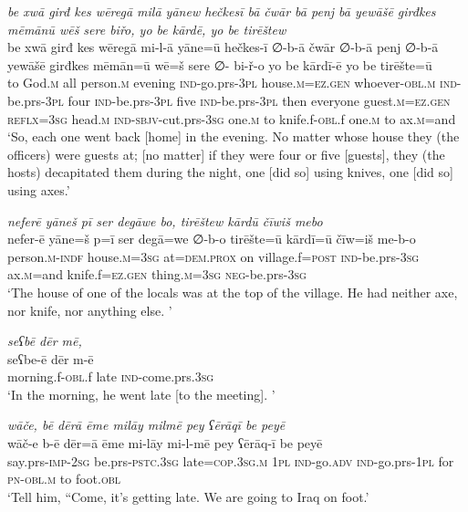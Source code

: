 \ea \label{BP.70}
\textit{be xwā girđ kes wēregā milā yānew hečkesī bā čwār bā penj bā yewāšē girđkes mēmānū wēš sere biřo, yo be kārdē, yo be tirēštew} \\ 
\gll be xwā girđ kes wēregā mi-l-ā yāne=ū hečkes-ī ∅-b-ā čwār ∅-b-ā penj ∅-b-ā yewāšē girđkes mēmān=ū wē=š sere ∅- bi-ř-o yo be kārdī-ē yo be tirēšte=ū \\ 
 to God\textsc{.m} all person\textsc{.m} evening \textsc{ind-}go.prs\textsc{-3pl} house\textsc{.m}\textsc{=ez.gen} whoever\textsc{-obl}\textsc{.m} \textsc{ind-}be.prs\textsc{-3pl} four \textsc{ind-}be.prs\textsc{-3pl} five \textsc{ind-}be.prs\textsc{-3pl} then everyone guest\textsc{.m}\textsc{=ez.gen} \textsc{reflx}\textsc{=3sg} head\textsc{.m} \textsc{ind-}\textsc{sbjv-}cut.prs\textsc{-3sg} one\textsc{.m} to knife.f\textsc{-obl}.f one\textsc{.m} to ax\textsc{.m}=and \\ 
\glt `So, each one went back [home] in the evening. No matter whose house they (the officers) were guests at; [no matter] if they were four or five [guests],  they  (the hosts) decapitated them during the night, one [did so] using knives, one [did so] using axes.'
\z 
 
\ea \label{BP.71}
\textit{neferē yāneš pī ser degāwe bo, tirēštew kārdū čīwiš mebo} \\ 
\gll nefer-ē yāne=š p=ī ser degā=we ∅-b-o tirēšte=ū kārdī=ū čīw=iš me-b-o \\ 
 person\textsc{.m}\textsc{-indf} house\textsc{.m}\textsc{=3sg} at=\textsc{dem.prox} on village.f\textsc{=\textsc{post}} \textsc{ind-}be.prs\textsc{-3sg} ax\textsc{.m}=and knife.f\textsc{=ez.gen} thing\textsc{.m}\textsc{=3sg} \textsc{neg-}be.prs\textsc{-3sg} \\ 
\glt `The house of one of the locals was at the top of the village. He had neither axe, nor knife, nor anything else. '
\z 
 
\ea \label{BP.74}
\textit{seʕbē dēr mē,} \\ 
\gll seʕbe-ē dēr m-ē \\ 
 morning.f\textsc{-obl}.f late \textsc{ind-}come.prs\textsc{.3sg} \\ 
\glt `In the morning, he went late [to the meeting]. '
\z 
 
\ea \label{BP.78}
\textit{wāče, bē dērā ēme milāy milmē pey ʕērāqī be peyē} \\ 
\gll wāč-e b-ē dēr=ā ēme mi-lāy mi-l-mē pey ʕērāq-ī be peyē \\ 
 say.prs-\textsc{imp-}\textsc{2sg} be.prs\textsc{-pstc}\textsc{.3sg} late\textsc{=cop}\textsc{.3sg}\textsc{.m} \textsc{1pl} \textsc{ind-}go\textsc{.adv} \textsc{ind-}go.prs\textsc{-\textsc{1pl}} for \textsc{pn}\textsc{-obl}\textsc{.m} to foot\textsc{.obl} \\ 
\glt `Tell him, “Come, it’s getting late. We are going to Iraq on foot.'
\z 
 
